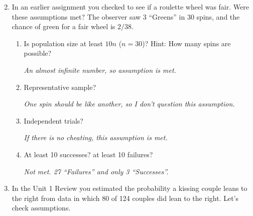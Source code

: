    \begin{enumerate}
     \setcounter{enumi}{1}
   \item In an earlier assignment  you checked to see if a roulette wheel was
     fair.  Were these assumptions met? The
     observer saw 3 ``Greens'' in 30 spins, and the  chance of
     green for a fair wheel is $2/38$. 
     \begin{enumerate}
        \item Is population size at least $10n$ ($n = 30$)? 
          Hint: How many spins are possible?    
\begin{students}
        \vspace{.7cm}        
\end{students}
\begin{key}
  {\it  An almost infinite number, so assumption is met.}
\end{key}
        \item Representative sample?   
\begin{students}
        \vspace{.7cm}        
\end{students}

\begin{key}
  {\it  One spin should be like another, so I don't question this  assumption.}
\end{key}
        \item Independent trials?   
\begin{students}
        \vspace{.7cm}        
\end{students}

\begin{key}
  {\it  If there is no cheating, this assumption is met.}
\end{key}
        \item At least 10 successes? at least 10 failures?   
\begin{students}
        \vspace{.7cm}        
\end{students}

\begin{key}
  {\it  Not met. 27 ``Failures'' and only 3 ``Successes''.}
\end{key}
     \end{enumerate}


    \item In the Unit 1 Review you estimated the probability
      a kissing couple leans to the right from data in which 80 of 124
      couples did lean to the right. Let's check assumptions. 
  

\end{enumerate}
